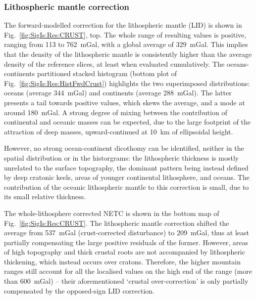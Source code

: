 \subsubsection{Lithospheric mantle correction}
\label{sss:SigIs:Results:Maps:LID}
The forward-modelled correction for the lithospheric mantle (LID) is shown in Fig.~\ref{fig:SigIs:Res:CRUST}, top.
The whole range of resulting values is positive, ranging from \num{113} to \SI{762}{mGal}, with a global average of \SI{329}{mGal}.
This implies that the density of the lithospheric mantle is consistently higher than the average density of the reference slices, at least when evaluated cumulatively.
The oceans-continents partitioned stacked histogram (bottom plot of Fig.~\ref{fig:SigIs:Res:HistFwdCrust}) highlights the two superimposed distributions: oceans (average \SI{344}{mGal}) and continents (average \SI{288}{mGal}). The latter presents a tail towards positive values, which skews the average, and a mode at around \SI{180}{mGal}.
A strong degree of mixing between the contribution of continental and oceanic masses can be expected, due to the large footprint of the attraction of deep masses, upward-continued at \SI{10}{\kilo \metre} of ellipsoidal height.

However, no strong ocean-continent dicothomy can be identified, neither in the spatial distribution or in the historgrams: the lithospheric thickness is mostly unrelated to the surface topography, the dominant pattern being instead defined by deep cratonic keels, areas of younger continental lithosphere, and oceans.
The contribution of the oceanic lithospheric mantle to this correction is small, due to its small relative thickness.

The whole-lithosphere corrected NETC is shown in the bottom map of Fig.~\ref{fig:SigIs:Res:CRUST}.
The lithospheric mantle correction shifted the average from \SI{537}{mGal} (crust-corrected disturbance) to \SI{209}{mGal}, thus at least partially compensating the large positive residuals of the former.
However, areas of high topography and thick crustal roots are not accompanied by lithospheric thickening, which instead occurs over cratons.
Therefore, the higher mountain ranges still account for all the localised values on the high end of the range (more than \SI{600}{mGal}) -- their aforementioned `crustal over-correction' is only partially compensated by the opposed-sign LID correction.


